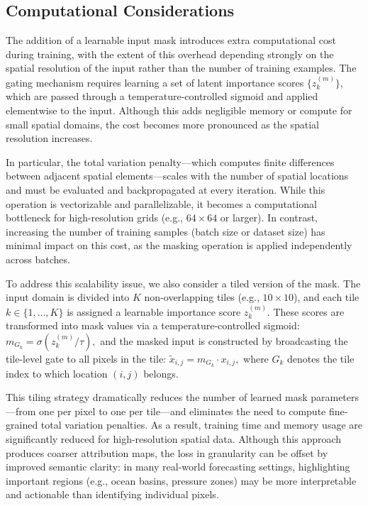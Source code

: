 \documentclass[12pt]{article}
\begin{document}
\subsection{Computational Considerations}

The addition of a learnable input mask introduces extra computational cost during training, with the extent of this overhead depending strongly on the spatial resolution of the input rather than the number of training examples. The gating mechanism requires learning a set of latent importance scores \( \{ z_k^{(m)} \} \), which are passed through a temperature-controlled sigmoid and applied elementwise to the input. Although this adds negligible memory or compute for small spatial domains, the cost becomes more pronounced as the spatial resolution increases.

In particular, the total variation penalty—which computes finite differences between adjacent spatial elements—scales with the number of spatial locations and must be evaluated and backpropagated at every iteration. While this operation is vectorizable and parallelizable, it becomes a computational bottleneck for high-resolution grids (e.g., \(64 \times 64\) or larger). In contrast, increasing the number of training samples (batch size or dataset size) has minimal impact on this cost, as the masking operation is applied independently across batches.

To address this scalability issue, we also consider a tiled version of the mask. The input domain is divided into \( K \) non-overlapping tiles (e.g., \(10 \times 10\)), and each tile \( k \in \{1, \dots, K\} \) is assigned a learnable importance score \( z_k^{(m)} \). These scores are transformed into mask values via a temperature-controlled sigmoid:
\(
m_{G_k} = \sigma\left( z_k^{(m)}/\tau \right),
\)
and the masked input is constructed by broadcasting the tile-level gate to all pixels in the tile:
\(
\tilde{x}_{i,j} = m_{G_k} \cdot x_{i,j},
\)
where \( G_k \) denotes the tile index to which location \( (i, j) \) belongs.

This tiling strategy dramatically reduces the number of learned mask parameters—from one per pixel to one per tile—and eliminates the need to compute fine-grained total variation penalties. As a result, training time and memory usage are significantly reduced for high-resolution spatial data. Although this approach produces coarser attribution maps, the loss in granularity can be offset by improved semantic clarity: in many real-world forecasting settings, highlighting important regions (e.g., ocean basins, pressure zones) may be more interpretable and actionable than identifying individual pixels.
\end{document}
